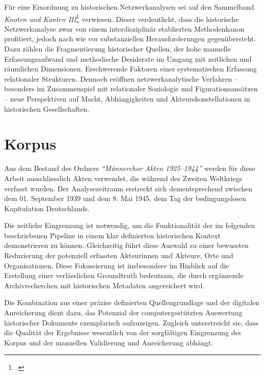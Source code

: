 \documentclass[12pt, a4paper, ngerman, bidi=default]{article}
\let\cite\footcite
\begin{document}
Für eine Einordnung zu historischen Netzwerkanalysen sei auf den Sammelband
\textit{Knoten und Kanten III}\cite{gamper_knoten_2015} verwiesen. Dieser  verdeutlicht, dass die historische Netzwerkanalyse zwar von einem interdisziplinär etablierten Methodenkanon 
profitiert, jedoch nach wie vor substanziellen Herausforderungen gegenübersteht. Dazu zählen die Fragmentierung historischer Quellen, der hohe manuelle 
Erfassungsaufwand und methodische Desiderate im Umgang mit zeitlichen und räumlichen Dimensionen. Erschwerende Faktoren einer systematischen Erfassung 
relationaler Strukturen. Dennoch eröffnen netzwerkanalytische Verfahren – besonders im Zusammenspiel mit relationaler Soziologie 
und Figurationsansätzen – neue Perspektiven auf Macht, Abhängigkeiten und Akteurskonstellationen in historischen Gesellschaften.






\section{Korpus}\label{section:Korpus}
Aus dem Bestand des Ordners \textit{``Männerchor Akten 1925--1944''} werden für diese Arbeit ausschliesslich Akten verwendet, 
die während des Zweiten Weltkriegs verfasst wurden. Der Analysezeitraum erstreckt sich dementsprechend zwischen dem 01. September 1939 
und dem 8. Mai 1945, dem Tag der bedingungslosen Kapitulation Deutschlands.

Die zeitliche Eingrenzung ist notwendig, um die Funktionalität der im folgenden beschriebenen Pipeline 
in einem klar definierten historischen Kontext demonstrieren zu können. Gleichzeitig führt diese Auswahl zu einer 
bewussten Reduzierung der potenziell erfassten Akteurinnen und Akteure, Orte und Organisationen. Diese Fokussierung ist 
insbesondere im Hinblick auf die Erstellung einer verlässlichen Groundtruth bedeutsam, die durch ergänzende Archivrecherchen 
mit historischen Metadaten angereichert wird.

Die Kombination aus einer präzise definierten Quellengrundlage und der digitalen Anreicherung dient dazu, das 
Potenzial der computergestützten Auswertung historischer Dokumente exemplarisch aufzuzeigen. 
Zugleich unterstreicht sie, dass die Qualität der Ergebnisse wesentlich von der sorgfältigen Eingrenzung 
des Korpus und der manuellen Validierung und Anreicherung abhängt.
\end{document}
